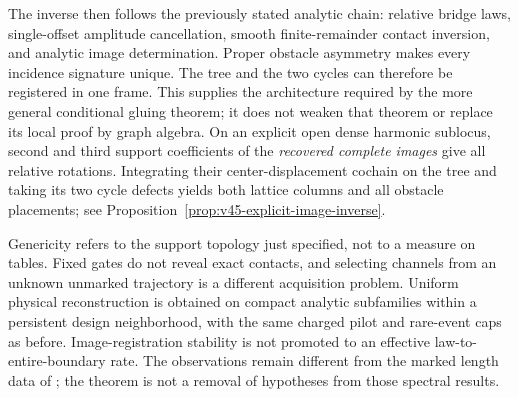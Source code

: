 The inverse then follows the previously stated analytic chain: relative
bridge laws, single-offset amplitude cancellation, smooth finite-remainder
contact inversion, and analytic image determination.  Proper obstacle
asymmetry makes every incidence signature unique.  The tree and the two
cycles can therefore be registered in one frame.  This supplies the
architecture required by the more general conditional gluing theorem; it
does not weaken that theorem or replace its local proof by graph algebra.
On an explicit open dense harmonic sublocus, second and third support
coefficients of the \emph{recovered complete images} give all relative
rotations.  Integrating their center-displacement cochain on the tree and
taking its two cycle defects yields both lattice columns and all obstacle
placements; see Proposition~\ref{prop:v45-explicit-image-inverse}.

Genericity refers to the support topology just specified, not to a measure
on tables.  Fixed gates do not reveal exact contacts, and selecting channels
from an unknown unmarked trajectory is a different acquisition problem.
Uniform physical reconstruction is obtained on compact analytic subfamilies
within a persistent design neighborhood, with the same charged pilot and
rare-event caps as before.  Image-registration stability is not promoted to
an effective law-to-entire-boundary rate.  The observations remain different
from the marked length data of \cite{DSKL,FinamoreLeguil}; the theorem is
not a removal of hypotheses from those spectral results.
